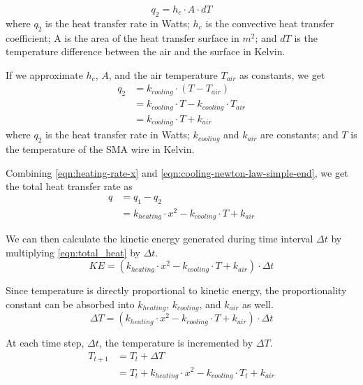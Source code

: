 \begin{equation}\label{eqn:cooling-newton-law}
q_2 = h_c \cdot A \cdot dT
\end{equation}
where $q_2$ is the heat transfer rate in Watts; $h_c$ is the convective heat transfer coefficient; A is the area of the heat transfer surface in $m^2$; and $dT$ is the temperature difference between the air and the surface in Kelvin.

If we approximate $h_c$, $A$, and the air temperature $T_{air}$ as constants, we get
\begin{subequations}\label{eqn:cooling-newton-law-simple}
	\begin{flalign}
	q_2 &= k_{cooling} \cdot (T - T_{air}) \\
	&= k_{cooling} \cdot T - k_{cooling} \cdot T_{air} \\
	&= k_{cooling} \cdot T + k_{air}\label{eqn:cooling-newton-law-simple-end}
	\end{flalign}
\end{subequations}
where $q_2$ is the heat transfer rate in Watts; $k_{cooling}$ and $k_{air}$ are constants; and $T$ is the temperature of the SMA wire in Kelvin.

Combining \eqref{eqn:heating-rate-x} and \eqref{eqn:cooling-newton-law-simple-end}, we get the total heat transfer rate as 
\begin{subequations}
	\begin{flalign}
	q &= q_1 - q_2 \\
	&= k_{heating} \cdot x^2 - k_{cooling} \cdot T + k_{air}\label{eqn:total_heat}
	\end{flalign}
\end{subequations}

We can then calculate the kinetic energy generated during time interval $\Delta t$ by multiplying \eqref{eqn:total_heat} by $\Delta t$.
\begin{equation}
KE =  (k_{heating} \cdot x^2 - k_{cooling} \cdot T + k_{air}) \cdot \Delta t \label{eqn:total_KE}
\end{equation}

Since temperature is directly proportional to kinetic energy, the proportionality constant can be absorbed into $k_{heating}$, $k_{cooling}$, and $ k_{air}$ as well. 
\begin{equation}
\Delta T =  (k_{heating} \cdot x^2 - k_{cooling} \cdot T  + k_{air}) \cdot \Delta t\label{eqn:delta_T}
\end{equation}

At each time step, $\Delta t$, the temperature is incremented by $\Delta T$.  
\begin{subequations}
	\begin{flalign}
	T_{t+1} &=  T_{t} + \Delta T \\
	&=  T_{t} + k_{heating} \cdot x^2 - k_{cooling} \cdot T_{t}  + k_{air}\label{eqn:sma-controller-model}
	\end{flalign}
\end{subequations}


